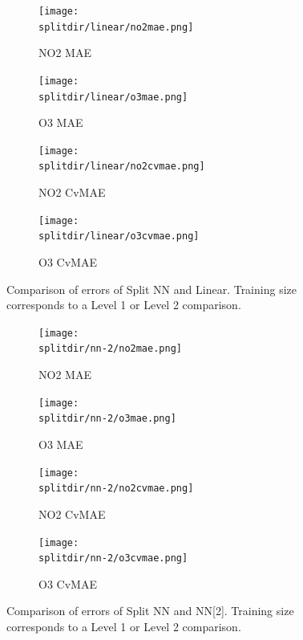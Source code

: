 \documentclass[journal abbreviation, manuscript]{copernicus}
\begin{document}
\begin{figure}[H]
\begin{subfigure}{0.49\textwidth}
\texttt{[image: \\splitdir/linear/no2mae.png]}
\caption{NO2 MAE}
\end{subfigure}
\begin{subfigure}{0.49\textwidth}
\texttt{[image: \\splitdir/linear/o3mae.png]}
\caption{O3 MAE}
\end{subfigure}
\begin{subfigure}{0.49\textwidth}
\texttt{[image: \\splitdir/linear/no2cvmae.png]}
\caption{NO2 CvMAE}
\end{subfigure}
\begin{subfigure}{0.49\textwidth}
\texttt{[image: \\splitdir/linear/o3cvmae.png]}
\caption{O3 CvMAE}
\end{subfigure}
\caption{Comparison of errors of Split NN and Linear. Training size corresponds to a Level 1 or Level 2 comparison.}
\end{figure}

\begin{figure}[H]
\begin{subfigure}{0.49\textwidth}
\texttt{[image: \\splitdir/nn-2/no2mae.png]}
\caption{NO2 MAE}
\end{subfigure}
\begin{subfigure}{0.49\textwidth}
\texttt{[image: \\splitdir/nn-2/o3mae.png]}
\caption{O3 MAE}
\end{subfigure}
\begin{subfigure}{0.49\textwidth}
\texttt{[image: \\splitdir/nn-2/no2cvmae.png]}
\caption{NO2 CvMAE}
\end{subfigure}
\begin{subfigure}{0.49\textwidth}
\texttt{[image: \\splitdir/nn-2/o3cvmae.png]}
\caption{O3 CvMAE}
\end{subfigure}
\caption{Comparison of errors of Split NN and NN[2]. Training size corresponds to a Level 1 or Level 2 comparison.}
\end{figure}
\end{document}
